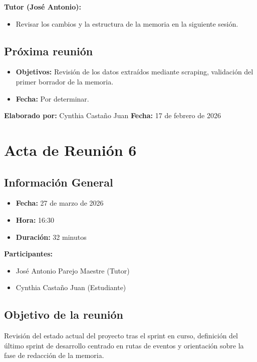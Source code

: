 \textbf{Tutor (José Antonio):}
\begin{itemize}
    \item Revisar los cambios y la estructura de la memoria en la siguiente sesión.
\end{itemize}

\subsection*{Próxima reunión}
\begin{itemize}
    \item \textbf{Objetivos:} Revisión de los datos extraídos mediante scraping, validación del primer borrador de la memoria.
    \item \textbf{Fecha:} Por determinar.
\end{itemize}

\textbf{Elaborado por:} Cynthia Castaño Juan \hfill \textbf{Fecha:} 17 de febrero de 2026

\newpage

\section*{Acta de Reunión 6}

\subsection*{Información General}
\begin{itemize}
    \item \textbf{Fecha:} 27 de marzo de 2026
    \item \textbf{Hora:} 16:30
    \item \textbf{Duración:} 32 minutos
\end{itemize}

\textbf{Participantes:}
\begin{itemize}
    \item José Antonio Parejo Maestre (Tutor)
    \item Cynthia Castaño Juan (Estudiante)
\end{itemize}

\subsection*{Objetivo de la reunión}
Revisión del estado actual del proyecto tras el sprint en curso, definición del último sprint de desarrollo centrado en rutas de eventos y orientación sobre la fase de redacción de la memoria.

